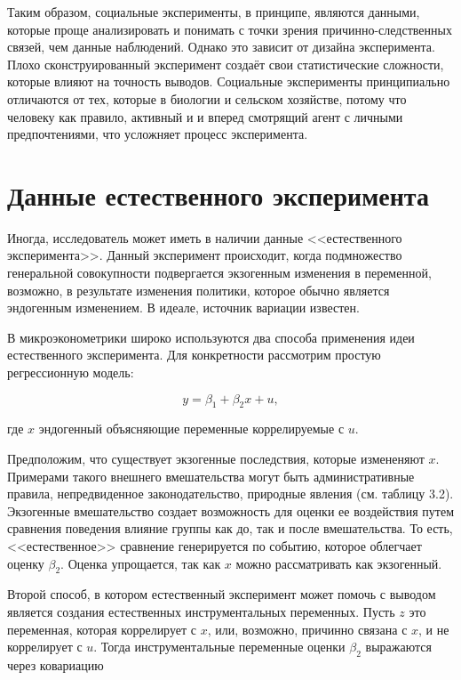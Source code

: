 Таким образом, социальные эксперименты, в принципе, являются данными, которые проще анализировать и понимать с точки зрения причинно-следственных связей, чем данные наблюдений. Однако это зависит от дизайна эксперимента. Плохо сконструированный эксперимент создаёт свои статистические сложности, которые влияют на точность выводов. Социальные эксперименты принципиально отличаются от тех, которые в биологии и сельском хозяйстве, потому что человеку как правило, активный и и вперед смотрящий агент с личными предпочтениями, что усложняет процесс эксперимента.



\section{Данные естественного эксперимента}


Иногда, исследователь может иметь в наличии данные <<естественного эксперимента>>. Данный эксперимент происходит, когда подмножество генеральной совокупности подвергается экзогенным изменения в переменной, возможно, в результате изменения политики, которое обычно является эндогенным изменением. В идеале, источник вариации известен.


В микроэконометрики широко используются два способа применения идеи естественного эксперимента. Для конкретности рассмотрим простую регрессионную модель:

\begin{equation}
y=\beta_{1}+\beta_{2}x+u,
\end{equation}

где $x$ эндогенный объясняющие переменные коррелируемые с $u$.


Предположим, что существует экзогенные последствия, которые измененяют $x$. Примерами такого внешнего вмешательства могут быть административные правила, непредвиденное законодательство, природные явления (см. таблицу 3.2). Экзогенные вмешательство создает возможность для оценки ее воздействия путем сравнения поведения влияние группы как до, так и после вмешательства. То есть, <<естественное>> сравнение генерируется по событию, которое облегчает оценку $\beta_{2}$. Оценка упрощается, так как $x$ можно рассматривать как экзогенный.


Второй способ, в котором естественный эксперимент может помочь с выводом является создания естественных инструментальных переменных. Пусть $z$ это переменная, которая коррелирует с $x$, или, возможно, причинно связана с $x$, и не коррелирует с $u$. Тогда инструментальные переменные оценки $\beta_{2}$ выражаются через ковариацию

